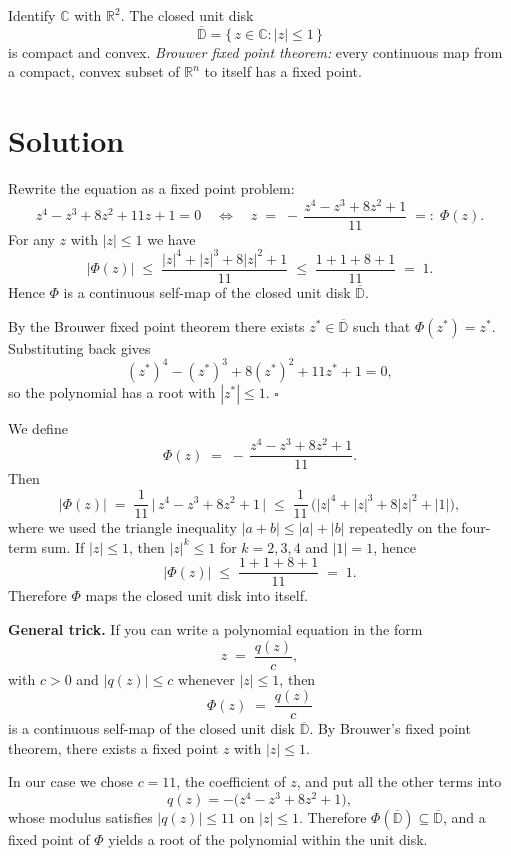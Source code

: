 \documentclass[12pt,a4paper]{article}
\newcommand{\qed}{\hfill$\square$}
\theoremstyle{plain}
\theoremstyle{definition}
\theoremstyle{remark}
\theoremstyle{remark}
\begin{document}
Identify $\mathbb{C}$ with $\mathbb{R}^2$. The closed unit disk
\[
\overline{\mathbb{D}}=\{\, z\in\mathbb{C} : |z|\le 1 \,\}
\]
is compact and convex.
\emph{Brouwer fixed point theorem:} every continuous map from a compact, convex subset of $\mathbb{R}^n$
to itself has a fixed point.

\bigskip

\section*{Solution}

Rewrite the equation as a fixed point problem:
\[
z^4 - z^3 + 8z^2 + 11z + 1 = 0
\quad\Longleftrightarrow\quad
z \;=\; -\,\frac{z^4 - z^3 + 8z^2 + 1}{11} \;=:\; \Phi(z).
\]
For any $z$ with $|z|\le 1$ we have
\[
|\Phi(z)| \;\le\; \frac{|z|^4 + |z|^3 + 8|z|^2 + 1}{11}
\;\le\; \frac{1 + 1 + 8 + 1}{11}
\;=\; 1.
\]
Hence $\Phi$ is a continuous self-map of the closed unit disk $\overline{\mathbb{D}}$.

By the Brouwer fixed point theorem there exists $z^*\in \overline{\mathbb{D}}$ such that $\Phi(z^*)=z^*$.
Substituting back gives
\[
(z^*)^4 - (z^*)^3 + 8(z^*)^2 + 11 z^* + 1 = 0,
\]
so the polynomial has a root with $|z^*|\le 1$. \qed

We define
\[
\Phi(z) \;=\; -\,\frac{z^4 - z^3 + 8z^2 + 1}{11}.
\]
Then
\[
|\Phi(z)|
\;=\;
\frac{1}{11}\,\bigl|\,z^4 - z^3 + 8z^2 + 1\,\bigr|
\;\le\;
\frac{1}{11}\,\bigl(|z|^4 + |z|^3 + 8|z|^2 + |1|\bigr),
\]
where we used the triangle inequality $|a+b|\le |a|+|b|$ repeatedly on the four-term sum.
If $|z|\le 1$, then $|z|^k\le 1$ for $k=2,3,4$ and $|1|=1$, hence
\[
|\Phi(z)| \;\le\; \frac{1+1+8+1}{11} \;=\; 1.
\]
Therefore $\Phi$ maps the closed unit disk into itself.

\bigskip
\noindent\textbf{General trick.}
If you can write a polynomial equation in the form
\[
z \;=\; \frac{q(z)}{c},
\]
with $c>0$ and $|q(z)|\le c$ whenever $|z|\le 1$, then
\[
\Phi(z) \;=\; \frac{q(z)}{c}
\]
is a continuous self-map of the closed unit disk $\overline{\mathbb{D}}$.
By Brouwer's fixed point theorem, there exists a fixed point $z$ with $|z|\le 1$.

\smallskip

In our case we chose $c=11$, the coefficient of $z$, and put all the other terms into
\[
q(z) = -\bigl(z^4 - z^3 + 8z^2 + 1\bigr),
\]
whose modulus satisfies $|q(z)|\le 11$ on $|z|\le 1$.
Therefore $\Phi(\overline{\mathbb{D}})\subseteq\overline{\mathbb{D}}$, and a fixed point
of $\Phi$ yields a root of the polynomial within the unit disk.
\end{document}
